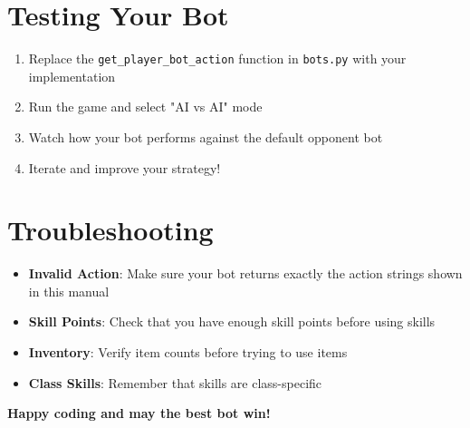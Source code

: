 \documentclass[12pt]{article}
\begin{document}
\section{Testing Your Bot}
\label{sec:testing}

\begin{enumerate}
    \item Replace the \texttt{get\_player\_bot\_action} function in \texttt{bots.py} with your implementation
    \item Run the game and select "AI vs AI" mode
    \item Watch how your bot performs against the default opponent bot
    \item Iterate and improve your strategy!
\end{enumerate}

\section{Troubleshooting}
\label{sec:troubleshooting}

\begin{itemize}
    \item \textbf{Invalid Action}: Make sure your bot returns exactly the action strings shown in this manual
    \item \textbf{Skill Points}: Check that you have enough skill points before using skills
    \item \textbf{Inventory}: Verify item counts before trying to use items
    \item \textbf{Class Skills}: Remember that skills are class-specific
\end{itemize}

\begin{center}
\Large\textbf{Happy coding and may the best bot win!}
\end{center}
\end{document}
